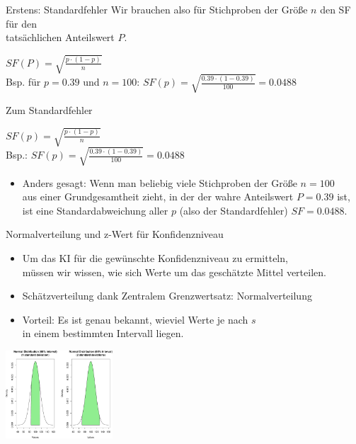 \begin{frame}
  {Erstens: Standardfehler}
  Wir brauchen also für Stichproben der Größe $n$ den SF für den\\
  tatsächlichen Anteilswert $P$.\\[3ex]

  \begin{center}
    $SF(P)=\sqrt{\frac{p\cdot(1-p)}{n}}$\\

    \vspace{1cm}
    Bsp. für $p=0.39$ und $n=100$: $SF(p)=\sqrt{\frac{0.39\cdot(1-0.39)}{100}}=0.0488$
  \end{center}
\end{frame}

\begin{frame}
  {Zum Standardfehler}
  \begin{center}
    \alert{$SF(p)=\sqrt{\frac{p\cdot(1-p)}{n}}$}\\

    \vspace{.1cm}
    Bsp.: $SF(p)=\sqrt{\frac{0.39\cdot(1-0.39)}{100}}=0.0488$
  \end{center}

  \vspace{.2cm}
  \pause
  \begin{itemize}[<+->]
    \item Anders gesagt: Wenn man beliebig viele Stichproben der Größe $n=100$\\
      aus einer Grundgesamtheit zieht, in der der \alert{wahre Anteilswert} $P=0.39$ ist,\\
      ist eine Standardabweichung aller $p$ (also der Standardfehler) $SF=0.0488$.
  \end{itemize}
\end{frame}

\begin{frame}
  {Normalverteilung und z-Wert für Konfidenzniveau}
  \begin{itemize}[<+->]
    \item Um das KI für die gewünschte Konfidenzniveau zu ermitteln,\\
      müssen wir wissen, wie sich Werte um das geschätzte Mittel verteilen.
    \item Schätzverteilung dank Zentralem Grenzwertsatz: \alert{Normalverteilung}
    \item Vorteil: Es ist genau bekannt, wieviel Werte je nach $s$\\
      in einem bestimmten Intervall liegen.
  \end{itemize}
  \pause
  \begin{center}
    \includegraphics[width=0.3\textwidth]{graphics/normal}
  \end{center}
\end{frame}

